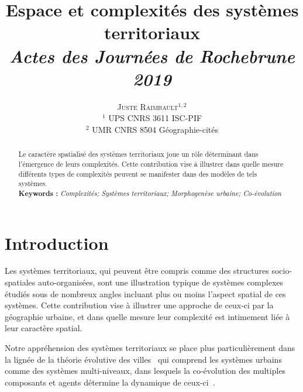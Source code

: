 \documentclass[11pt]{article}
\newcommand{\noun}[1]{\textsc{#1}}
\begin{document}
\title{Espace et complexités des systèmes territoriaux
\\\medskip
\textit{Actes des Journ{\'e}es de Rochebrune 2019}
}
\author{\noun{Juste Raimbault}$^{1,2}$
\\
$^1$ UPS CNRS 3611 ISC-PIF\\
$^2$ UMR CNRS 8504 G{\'e}ographie-cit{\'e}s
}
\date{}





\maketitle

\justify

\begin{abstract}
	Le caractère spatialisé des systèmes territoriaux joue un rôle déterminant dans l'émergence de leurs complexités. Cette contribution vise à illustrer dans quelle mesure différents types de complexités peuvent se manifester dans des modèles de tels systèmes.\\\medskip
	\noindent\textbf{Keywords : }\textit{Complexités; Systèmes territoriaux; Morphogenèse urbaine; Co-évolution}
\end{abstract}





\section{Introduction}


Les systèmes territoriaux, qui peuvent être compris comme des structures socio-spatiales auto-organisées, sont une illustration typique de systèmes complexes étudiés sous de nombreux angles incluant plus ou moins l'aspect spatial de ces systèmes. Cette contribution vise à illustrer une approche de ceux-ci par la géographie urbaine, et dans quelle mesure leur complexité est intimement liée à leur caractère spatial.

Notre appréhension des systèmes territoriaux se place plus particulièrement dans la lignée de la théorie évolutive des villes~\citep{pumain1997pour} qui comprend les systèmes urbains comme des systèmes multi-niveaux, dans lesquels la co-évolution des multiples composants et agents détermine la dynamique de ceux-ci~\citep{raimbault2018caracterisation}.
\end{document}
